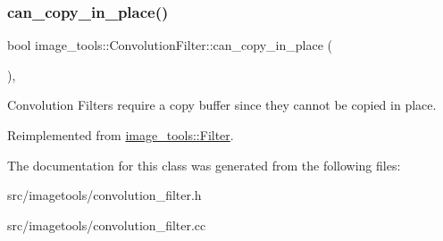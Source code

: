 \subsubsection{\texorpdfstring{can\+\_\+copy\+\_\+in\+\_\+place()}{can\_copy\_in\_place()}}
{\footnotesize\ttfamily bool image\+\_\+tools\+::\+Convolution\+Filter\+::can\+\_\+copy\+\_\+in\+\_\+place (\begin{DoxyParamCaption}{ }\end{DoxyParamCaption})\hspace{0.3cm}{\ttfamily [override]}, {\ttfamily [virtual]}}

Convolution Filters require a copy buffer since they cannot be copied in place. 

Reimplemented from \hyperlink{classimage__tools_1_1Filter_abb21c6ce1f09a4ce4fbd38255c44d281}{image\+\_\+tools\+::\+Filter}.



The documentation for this class was generated from the following files\+:\begin{DoxyCompactItemize}
\item 
src/imagetools/convolution\+\_\+filter.\+h\item 
src/imagetools/convolution\+\_\+filter.\+cc\end{DoxyCompactItemize}
